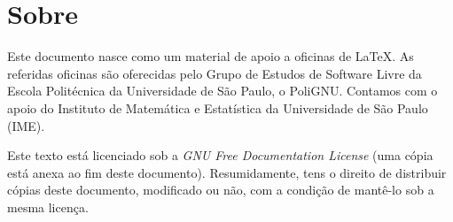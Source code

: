 \section*{Sobre}

Este documento nasce como um material de apoio a oficinas de
\LaTeX. As referidas oficinas são oferecidas pelo Grupo de Estudos de
Software Livre da Escola Politécnica da Universidade de São Paulo, o
PoliGNU. Contamos com o apoio do Instituto de Matemática e Estatística
da Universidade de São Paulo (IME).

Este texto está licenciado sob a \emph{GNU Free
Documentation License} (uma cópia está anexa ao fim deste documento).
Resumidamente, tens o direito de distribuir cópias deste documento,
modificado ou não, com a condição de mantê-lo sob a mesma licença.

\clearpage

